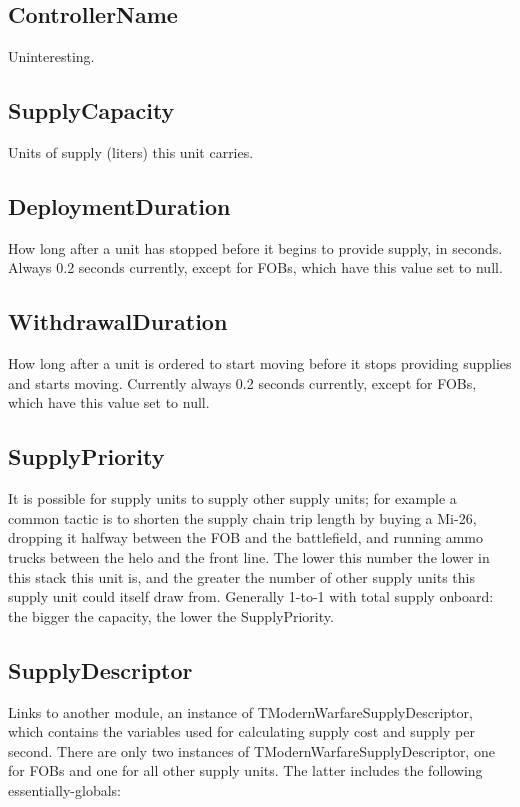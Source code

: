 \documentclass{article}
\begin{document}
\subsection{ControllerName}

Uninteresting.

\subsection{SupplyCapacity}

Units of supply (liters) this unit carries.

\subsection{DeploymentDuration}

How long after a unit has stopped before it begins to provide supply, in seconds. Always 0.2 seconds currently, except for FOBs, which have this value set to null.

\subsection{WithdrawalDuration}

How long after a unit is ordered to start moving before it stops providing supplies and starts moving. Currently always 0.2 seconds currently, except for FOBs, which have this value set to null.

\subsection{SupplyPriority}

It is possible for supply units to supply other supply units; for example a common tactic is to shorten the supply chain trip length by buying a Mi-26, dropping it halfway between the FOB and the battlefield, and running ammo trucks between the helo and the front line. The lower this number the lower in this stack this unit is, and the greater the number of other supply units this supply unit could itself draw from. Generally 1-to-1 with total supply onboard: the bigger the capacity, the lower the SupplyPriority.

\subsection{SupplyDescriptor}

Links to another module, an instance of TModernWarfareSupplyDescriptor, which contains the variables used for calculating supply cost and supply per second. There are only two instances of TModernWarfareSupplyDescriptor, one for FOBs and one for all other supply units. The latter includes the following essentially-globals:
\end{document}

